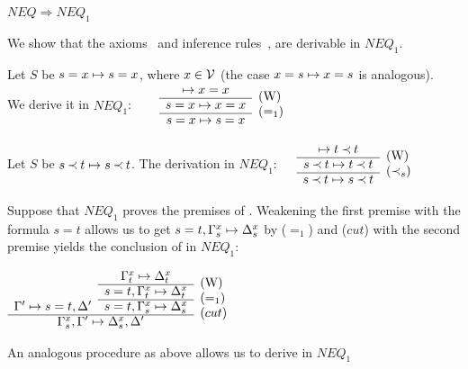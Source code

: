 \begin{LEMMA}\label{le:neqtoneq1} $NEQ \Rightarrow NEQ_1$ \end{LEMMA}
\begin{PROOF}
We show that the axioms~ and inference rules~,
 are derivable in $NEQ_1$.
\begin{LS}\MyLPar
\item Let $S$ be $s=x\mathrel{\mapsto} s=x$, where $x\in\mbox{$\cal V$}$ (the case
$x=s\mathrel{\mapsto} x=s$ is analogous). \\ We derive it in $NEQ_1$: \ \ \ 
\( \begin{array}{cl}
  \Seq x=x & \raisebox{-1.2ex}[1.5ex][0ex]{(W)} \\ \cline{1-1}
  s=x\Seq x=x & \raisebox{-1.2ex}[1.5ex][0ex]{($=_1$)} \\ \cline{1-1}
  s=x\Seq s=x
\end{array} \) 
\item Let $S$ be $s\mathbin{\prec} t\mathrel{\mapsto} s\mathbin{\prec} t$. The derivation in $NEQ_1$:\ \ \ 
\( \begin{array}{cl}
  \Seq t\Incl t & \raisebox{-1.2ex}[1.5ex][0ex]{(W)} \\ \cline{1-1}
  s\Incl t\Seq t\Incl t & \raisebox{-1.2ex}[1.5ex][0ex]{($\Incl_s$)} \\ \cline{1-1}
  s\Incl t\Seq s\Incl t
\end{array} \)
\item Suppose that $NEQ_1$ proves the premises of . Weakening the
first premise with the formula $s=t$ allows us to get $s=t,\Gamma_s^x\mathrel{\mapsto}\Delta_s^x$ by
($=_1$) and ($cut$) with the second premise yields the conclusion of 
\reff{ru:neqeq} in $NEQ_1$:
\begin{center} \( \begin{array}{ccl}
 & \Gamma_t^x\Seq\Delta_t^x & \raisebox{-1.2ex}[1.5ex][0ex]{(W)} \\ \cline{2-2}
 & s=t,\Gamma_t^x\Seq\Delta_t^x & \raisebox{-1.2ex}[1.5ex][0ex]{($=_1$)} 
      \\ \cline{2-2}
\Gamma'\Seq s=t,\Delta' & s=t,\Gamma_s^x\Seq\Delta_s^x 
   & \raisebox{-1.2ex}[1.5ex][0ex]{($cut$)} \\ \cline{1-2}
\multicolumn{2}{c}{\Gamma_s^x,\Gamma'\Seq\Delta_s^x,\Delta'}
\end{array} \) \end{center}
\item An analogous procedure as above allows us to derive  in $NEQ_1$
\end{LS}
\end{PROOF}


